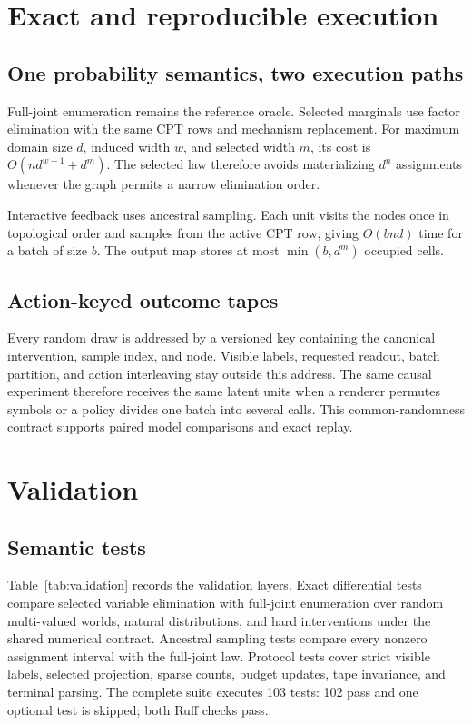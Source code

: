 \documentclass{article}
\begin{document}
\section{Exact and reproducible execution}

\subsection{One probability semantics, two execution paths}

Full-joint enumeration remains the reference oracle. Selected marginals use
factor elimination with the same CPT rows and mechanism replacement.
For maximum domain size $d$, induced width $w$, and selected width $m$, its cost
is $O(nd^{w+1}+d^m)$. The selected law therefore avoids materializing $d^n$
assignments whenever the graph permits a narrow elimination order.

Interactive feedback uses ancestral sampling. Each unit visits the nodes once in
topological order and samples from the active CPT row, giving $O(bnd)$ time for a
batch of size $b$. The output map stores at most $\min(b,d^m)$ occupied cells.

\subsection{Action-keyed outcome tapes}

Every random draw is addressed by a versioned key containing the canonical
intervention, sample index, and node. Visible labels, requested readout, batch
partition, and action interleaving stay outside this address. The same causal
experiment therefore receives the same latent units when a renderer permutes
symbols or a policy divides one batch into several calls. This common-randomness
contract supports paired model comparisons and exact replay.

\section{Validation}

\subsection{Semantic tests}

Table~\ref{tab:validation} records the validation layers. Exact differential tests
compare selected variable elimination with full-joint enumeration over random
multi-valued worlds, natural distributions, and hard interventions under the
shared numerical contract. Ancestral
sampling tests compare every nonzero assignment interval with the full-joint law.
Protocol tests cover strict visible labels, selected projection, sparse counts,
budget updates, tape invariance, and terminal parsing. The complete suite executes
103 tests: 102 pass and one optional test is skipped; both Ruff checks pass.
\end{document}
